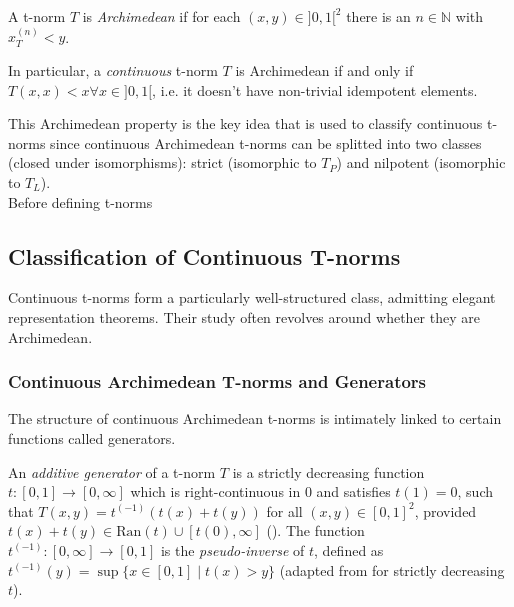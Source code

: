 \begin{definition}
A t-norm $T$ is \emph{Archimedean} if for each $(x,y) \in ]0,1[^2$ there is an $n \in \mathbb{N}$ with $x_T^{(n)} < y$. \cite[Def.~2.9]{Klement2000}  

In particular, a \textit{continuous} t-norm $T$ is Archimedean if and only if $T(x,x) < x \forall x \in ]0,1[$, i.e. it doesn't have non-trivial idempotent elements. \cite[Thm.~2.12]{Klement2000}
\end{definition}

This Archimedean property is the key idea that is used to classify continuous t-norms since continuous Archimedean t-norms can be splitted into two classes (closed under isomorphisms): strict (isomorphic to $T_P$) and nilpotent (isomorphic to $T_L$). \\

Before defining t-norms



\subsection{Classification of Continuous T-norms}

Continuous t-norms form a particularly well-structured class, admitting elegant representation theorems. Their study often revolves around whether they are Archimedean.

\subsubsection{Continuous Archimedean T-norms and Generators}
The structure of continuous Archimedean t-norms is intimately linked to certain functions called generators.
\begin{definition}
  An \emph{additive generator} of a t-norm $T$ is a strictly decreasing function $t: [0,1] \to [0,\infty]$ which is right-continuous in $0$ and satisfies $t(1)=0$, such that $T(x,y) = t^{(-1)}(t(x) + t(y))$ for all $(x,y) \in [0,1]^2$, provided $t(x)+t(y) \in \mathrm{Ran}(t) \cup [t(0),\infty]$ (\cite[Def.~3.25, p.~70]{Klement2000}).
  The function $t^{(-1)}: [0,\infty] \to [0,1]$ is the \emph{pseudo-inverse} of $t$, defined as $t^{(-1)}(y) = \sup \{ x \in [0,1] \mid t(x) > y \}$ (adapted from \cite[Def.~3.2, p.~68 and Cor.~3.3]{Klement2000} for strictly decreasing $t$). 
\end{definition}

